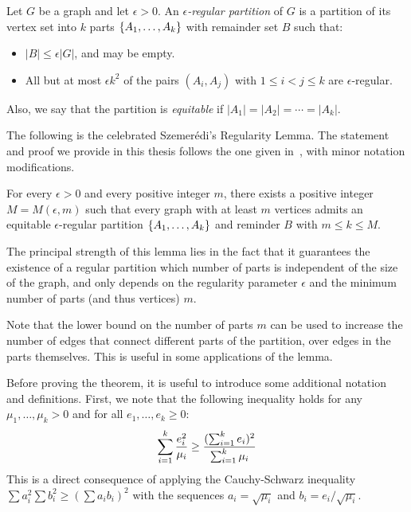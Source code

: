         \begin{definition}
            Let $G$ be a graph and let $\epsilon > 0$.
            An \emph{$\epsilon$-regular partition} of $G$ is a partition of its vertex set into $k$ parts
            $\{ A_1, \ldots, A_k \}$ with remainder set $B$ such that:
            \begin{itemize}
                \item $|B| \leq \epsilon |G|$, and may be empty.
                \item All but at most $\epsilon k^2$ of the pairs $(A_i, A_j)$ with $1 \leq i < j \leq k$ are
                    $\epsilon$-regular.
            \end{itemize}
            Also, we say that the partition is \emph{equitable} if $|A_1| = |A_2| = \cdots = |A_k|$.
        \end{definition}

        The following is the celebrated Szemer\'edi's Regularity Lemma.
        The statement and proof we provide in this thesis follows the one given in~\cite{extremal_graph_theory},
        with minor notation modifications.

        \begin{theorem} \label{thm:szemeredi_regularity_lemma}
            For every $\epsilon > 0$ and every positive integer $m$, there exists a positive integer $M = M(\epsilon, m)$
            such that every graph with at least $m$ vertices admits an equitable $\epsilon$-regular partition
            $\{ A_1, \ldots, A_k \}$ and reminder $B$ with $m \leq k \leq M$.
        \end{theorem}

        The principal strength of this lemma lies in the fact that it guarantees the existence of a regular partition
        which number of parts is independent of the size of the graph, and only depends on the regularity parameter
        $\epsilon$ and the minimum number of parts (and thus vertices) $m$.

        Note that the lower bound on the number of parts $m$ can be used to increase the number of edges that connect
        different parts of the partition, over edges in the parts themselves.
        This is useful in some applications of the lemma.

        Before proving the theorem, it is useful to introduce some additional notation and definitions.
        First, we note that the following inequality holds for any $\mu_1, \dots, \mu_k > 0$ and for all
        $e_1, \dots, e_k \geq 0$:
        \begin{equation} \label{eq:cauchy_schwarz_inequality_plus}
            \sum_{i=1}^k \frac{e_i^2}{\mu_i}
                \geq \frac{( \sum_{i=1}^k e_i )^2}{\sum_{i=1}^k \mu_i}
        \end{equation}
        This is a direct consequence of applying the Cauchy-Schwarz inequality $\sum a_i^2 \sum b_i^2 \geq (\sum a_i b_i)^2$
        with the sequences $a_i = \sqrt{\mu_i}$ and $b_i = e_i / \sqrt{\mu_i}$.

